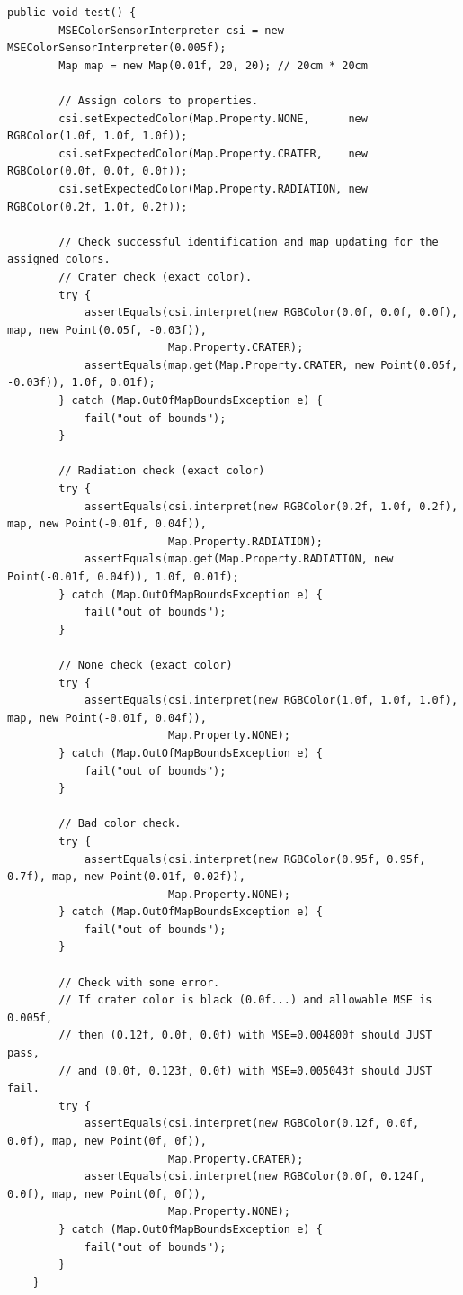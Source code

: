 \documentclass[12pt,a4paper]{article}
\begin{document}
     \begin{lstlisting}[caption=MSEColorSensorInterpreter automated test suite 1, captionpos=b, label={lst:MSEColorSensorInterpreterAutomatedTestSuite1}]
     public void test() {
        MSEColorSensorInterpreter csi = new MSEColorSensorInterpreter(0.005f);
        Map map = new Map(0.01f, 20, 20); // 20cm * 20cm
        
        // Assign colors to properties.
        csi.setExpectedColor(Map.Property.NONE,      new RGBColor(1.0f, 1.0f, 1.0f));
        csi.setExpectedColor(Map.Property.CRATER,    new RGBColor(0.0f, 0.0f, 0.0f));
        csi.setExpectedColor(Map.Property.RADIATION, new RGBColor(0.2f, 1.0f, 0.2f));

        // Check successful identification and map updating for the assigned colors.
        // Crater check (exact color).
        try {
            assertEquals(csi.interpret(new RGBColor(0.0f, 0.0f, 0.0f), map, new Point(0.05f, -0.03f)),
                         Map.Property.CRATER);
            assertEquals(map.get(Map.Property.CRATER, new Point(0.05f, -0.03f)), 1.0f, 0.01f);
        } catch (Map.OutOfMapBoundsException e) {
            fail("out of bounds");
        }
        
        // Radiation check (exact color)
        try {
            assertEquals(csi.interpret(new RGBColor(0.2f, 1.0f, 0.2f), map, new Point(-0.01f, 0.04f)),
                         Map.Property.RADIATION);
            assertEquals(map.get(Map.Property.RADIATION, new Point(-0.01f, 0.04f)), 1.0f, 0.01f);
        } catch (Map.OutOfMapBoundsException e) {
            fail("out of bounds");
        }
        
        // None check (exact color)
        try {
            assertEquals(csi.interpret(new RGBColor(1.0f, 1.0f, 1.0f), map, new Point(-0.01f, 0.04f)),
                         Map.Property.NONE);
        } catch (Map.OutOfMapBoundsException e) {
            fail("out of bounds");
        }
        
        // Bad color check.
        try {
            assertEquals(csi.interpret(new RGBColor(0.95f, 0.95f, 0.7f), map, new Point(0.01f, 0.02f)),
                         Map.Property.NONE);
        } catch (Map.OutOfMapBoundsException e) {
            fail("out of bounds");
        }
        
        // Check with some error.
        // If crater color is black (0.0f...) and allowable MSE is 0.005f,
        // then (0.12f, 0.0f, 0.0f) with MSE=0.004800f should JUST pass,
        // and (0.0f, 0.123f, 0.0f) with MSE=0.005043f should JUST fail.
        try {
            assertEquals(csi.interpret(new RGBColor(0.12f, 0.0f, 0.0f), map, new Point(0f, 0f)),
                         Map.Property.CRATER);
            assertEquals(csi.interpret(new RGBColor(0.0f, 0.124f, 0.0f), map, new Point(0f, 0f)),
                         Map.Property.NONE);
        } catch (Map.OutOfMapBoundsException e) {
            fail("out of bounds");
        }
    }
     
      \end{lstlisting}
      
\end{document}
